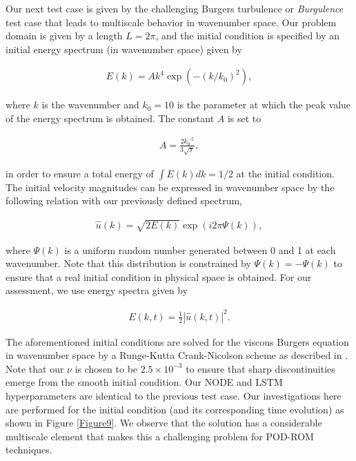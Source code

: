 \documentclass[preprint,12pt]{elsarticle}
\begin{document}
Our next test case is given by the challenging Burgers turbulence or \emph{Burgulence} test case that leads to multiscale behavior in wavenumber space. Our problem domain is given by a length $L=2 \pi$, and the initial condition is specified by an initial energy spectrum (in wavenumber space) given by
\begin{linenomath*}
\begin{align}
E(k)=A k^{4} \exp \left(-\left(k / k_{0}\right)^{2}\right),
\end{align}
\end{linenomath*}
where $k$ is the wavenumber and $k_0 = 10$ is the parameter at which the peak value of the energy spectrum is obtained. The constant $A$ is set to 
\begin{linenomath*}
\begin{align}
A=\frac{2 k_{0}^{-5}}{3 \sqrt{\pi}},
\end{align}
\end{linenomath*}
in order to ensure a total energy of $\int E(k) d k=1 / 2$ at the initial condition. The initial velocity magnitudes can be expressed in wavenumber space by the following relation with our previously defined spectrum,
\begin{linenomath*}
\begin{align}
\hat{u}(k)=\sqrt{2 E(k)} \exp (i 2 \pi \Psi(k)),
\end{align}
\end{linenomath*}
where $\Psi(k)$ is a uniform random number generated between 0 and 1 at each wavenumber. Note that this distribution is constrained by $\Psi(k) = -\Psi(k)$ to ensure that a real initial condition in physical space is obtained. For our assessment, we use energy spectra given by
\begin{linenomath*}
\begin{align}
E(k, t)=\frac{1}{2}|\hat{u}(k, t)|^{2}.
\end{align}
\end{linenomath*}
The aforementioned initial conditions are solved for the viscous Burgers equation in wavenumber space by a Runge-Kutta Crank-Nicolson scheme as described in \cite{san2013stationary}. Note that our $\nu$ is chosen to be $2.5\times10^{-3}$ to ensure that sharp discontinuities emerge from the smooth initial condition. Our NODE and LSTM hyperparameters are identical to the previous test case. Our investigations here are performed for the initial condition (and its corresponding time evolution) as shown in Figure \ref{Figure9}. We observe that the solution has a considerable multiscale element that makes this a challenging problem for POD-ROM techniques. 
\end{document}
